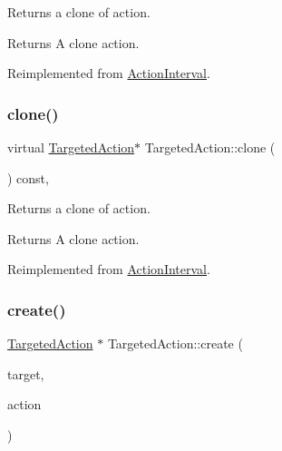 Returns a clone of action.

\begin{DoxyReturn}{Returns}
A clone action. 
\end{DoxyReturn}


Reimplemented from \hyperlink{classActionInterval_abc93ce0c2f54a90eb216a7803f25f44a}{Action\+Interval}.

\mbox{\label{classTargetedAction_a656924ba4addd3f5599c5c1c4032578d}} 
\subsubsection{\texorpdfstring{clone()}{clone()}\hspace{0.1cm}{\footnotesize\ttfamily [2/2]}}
{\footnotesize\ttfamily virtual \hyperlink{classTargetedAction}{Targeted\+Action}$\ast$ Targeted\+Action\+::clone (\begin{DoxyParamCaption}\item[{void}]{ }\end{DoxyParamCaption}) const\hspace{0.3cm}{\ttfamily [override]}, {\ttfamily [virtual]}}

Returns a clone of action.

\begin{DoxyReturn}{Returns}
A clone action. 
\end{DoxyReturn}


Reimplemented from \hyperlink{classActionInterval_abc93ce0c2f54a90eb216a7803f25f44a}{Action\+Interval}.

\mbox{\label{classTargetedAction_ad30cd1e7fcba3c18914be8bf6e71ac28}} 
\subsubsection{\texorpdfstring{create()}{create()}\hspace{0.1cm}{\footnotesize\ttfamily [1/2]}}
{\footnotesize\ttfamily \hyperlink{classTargetedAction}{Targeted\+Action} $\ast$ Targeted\+Action\+::create (\begin{DoxyParamCaption}\item[{\hyperlink{classNode}{Node} $\ast$}]{target,  }\item[{\hyperlink{classFiniteTimeAction}{Finite\+Time\+Action} $\ast$}]{action }\end{DoxyParamCaption})\hspace{0.3cm}{\ttfamily [static]}}

